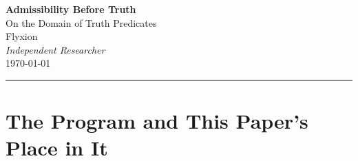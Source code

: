 \documentclass[12pt, oneside]{article}
\theoremstyle{plain}
\theoremstyle{definition}
\theoremstyle{remark}
\DeclareMathOperator{\Rest}{Rest}
\newcommand{\Dsub}{\mathcal{D}}
\newcommand{\Tsub}{\mathcal{T}}
\newcommand{\iotamap}{\iota}        %
\newcommand{\RestR}{\Rest(\mathcal{R})}
\newcommand{\Undef}{\mathord{\perp}} %
\begin{document}
\begin{center}
  {\LARGE\bfseries Admissibility Before Truth}\\[0.9em]
  {\large On the Domain of Truth Predicates}\\[1.5em]
  {\normalsize Flyxion}\\[0.3em]
  {\small\itshape Independent Researcher}\\[1.6em]
  {\small\today}
\end{center}

\vspace{0.5em}

\begin{abstract}
\noindent
Standard epistemology treats truth as the primary predicate and asks
which beliefs satisfy it.
This paper argues that truth is not primary but derived: it is a
partial predicate whose domain is determined by a prior structure,
the observer's admissibility manifold.
We prove the \emph{Domain Restriction Theorem}: every well-defined
truth predicate $\Tsub$ factors through the inclusion
$\iotamap: \RestR \hookrightarrow \Dsub$
of the restorable distinction space into the full distinction space,
so that $\operatorname{dom}(\Tsub) \subseteq \RestR$.
Distinctions outside the admissible set are not false; they are
unevaluable, receiving the third value $\Undef$ in a natural
three-valued extension.
The theorem is not a philosophical claim but a structural consequence
of the repair-theoretic framework developed in the companion papers
\cite{Flyxion2026a,Flyxion2026b}: truth-evaluation is itself a repair
process, and can only operate where repair capacity exists.
Consequences are derived for Bayesian inference, machine learning,
legal admissibility, language acquisition, and the Kuhnian account
of scientific revolutions.
In each case, what had appeared to be a domain-specific epistemic
constraint is revealed to be an instance of the same domain
restriction.
The paper is the third in a five-paper program; an appendix
summarises the definitions required from the companion papers so
that the central theorem can be read independently.
\end{abstract}

\vspace{1.2em}
\hrule
\vspace{1.6em}

\section{The Program and This Paper's Place in It}
\label{sec:intro}
\end{document}
